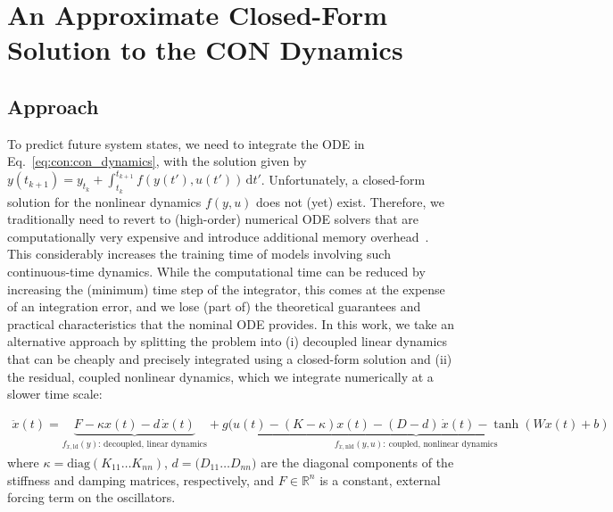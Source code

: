 \section{An Approximate Closed-Form Solution to the CON Dynamics}

\subsection{Approach}\label{sub:con:cfa:approach}
To predict future system states, we need to integrate the ODE in Eq.~\eqref{eq:con:con_dynamics}, with the solution given by $y(t_{k+1}) = y_{t_k} + \int_{t_k}^{t_{k+1}} f(y(t'), u(t')) \, \mathrm{d}t'$.
Unfortunately, a closed-form solution for the nonlinear dynamics $f(y, u)$ does not (yet) exist. Therefore, we traditionally need to revert to (high-order) numerical \gls{ODE} solvers that are computationally very expensive and introduce additional memory overhead~\cite{kidger2021neural}. This considerably increases the training time of models involving such continuous-time dynamics.
While the computational time can be reduced by increasing the (minimum) time step of the integrator, this comes at the expense of an integration error, and we lose (part of) the theoretical guarantees and practical characteristics that the nominal \gls{ODE} provides.
In this work, we take an alternative approach by splitting the problem into (i) decoupled linear dynamics that can be cheaply and precisely integrated using a closed-form solution and (ii) the residual, coupled nonlinear dynamics, which we integrate numerically at a slower time scale:

\begin{equation}\label{eq:con:con_split_linear_terms}
\begin{split}
    \ddot{x}(t) = \underbrace{F -\kappa x(t) - d \, \dot{x}(t)}_{f_{\ddot{x}, \mathrm{ld}}(y): \, \text{decoupled, linear dynamics}} + \underbrace{g(u(t)-(K-\kappa) x(t) - (D-d) \, \dot{x}(t) - \tanh(W x(t) + b)}_{f_{\ddot{x}, \mathrm{nld}}(y, u): \: \text{coupled, nonlinear dynamics}}
\end{split}
\end{equation}
where $\kappa = \mathrm{diag}(K_{11} \dots K_{nn})$, $d = \mathrm(D_{11} \dots D_{nn})$ are the diagonal components of the stiffness and damping matrices, respectively, and $F \in \mathbb{R}^{n}$ is a constant, external forcing term on the oscillators.

